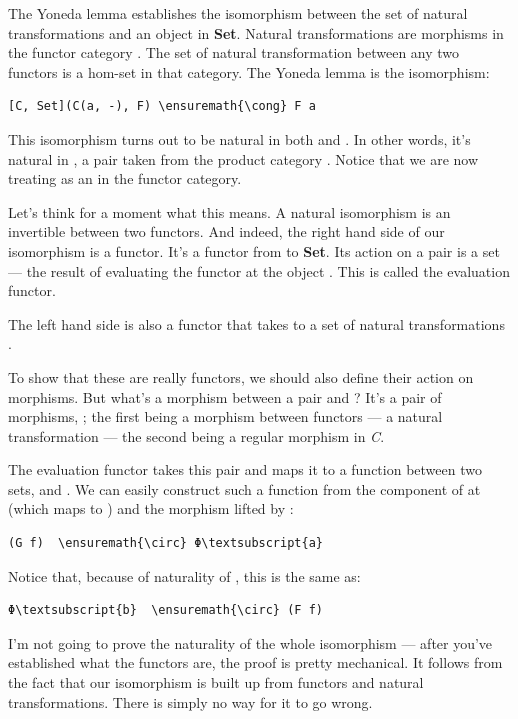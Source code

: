 The Yoneda lemma establishes the isomorphism between the set of natural
transformations and an object in \textbf{Set}. Natural transformations
are morphisms in the functor category \code{{[}C, Set{]}}. The set of
natural transformation between any two functors is a hom-set in that
category. The Yoneda lemma is the isomorphism:

\begin{Verbatim}[commandchars=\\\{\}]
[C, Set](C(a, -), F) \ensuremath{\cong} F a
\end{Verbatim}
This isomorphism turns out to be natural in both  and
. In other words, it's natural in , a pair
taken from the product category . Notice
that we are now treating  as an  in the functor
category.

Let's think for a moment what this means. A natural isomorphism is an
invertible  between two functors. And
indeed, the right hand side of our isomorphism is a functor. It's a
functor from  to \textbf{Set}. Its action on
a pair  is a set --- the result of evaluating the
functor  at the object . This is called the
evaluation functor.

The left hand side is also a functor that takes  to a
set of natural transformations .

To show that these are really functors, we should also define their
action on morphisms. But what's a morphism between a pair
 and ? It's a pair of morphisms,
; the first being a morphism between functors --- a
natural transformation --- the second being a regular morphism in
\emph{C}.

The evaluation functor takes this pair  and maps it to a
function between two sets,  and . We can
easily construct such a function from the component of  at
 (which maps  to ) and the morphism
 lifted by :

\begin{Verbatim}[commandchars=\\\{\}]
(G f)  \ensuremath{\circ} Φ\textsubscript{a}
\end{Verbatim}
Notice that, because of naturality of , this is the same as:

\begin{Verbatim}[commandchars=\\\{\}]
Φ\textsubscript{b}  \ensuremath{\circ} (F f)
\end{Verbatim}
I'm not going to prove the naturality of the whole isomorphism --- after
you've established what the functors are, the proof is pretty
mechanical. It follows from the fact that our isomorphism is built up
from functors and natural transformations. There is simply no way for it
to go wrong.

